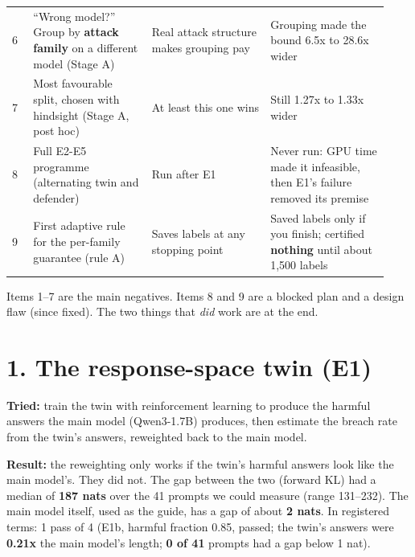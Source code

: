 \documentclass[11pt]{article}
\begin{document}
\begin{longtable}{@{}>{\raggedright\arraybackslash}p{0.059\linewidth}>{\raggedright\arraybackslash}p{0.290\linewidth}>{\raggedright\arraybackslash}p{0.290\linewidth}>{\raggedright\arraybackslash}p{0.290\linewidth}@{}}
\hspace{0pt}6 & \hspace{0pt}``Wrong model?'' Group by \textbf{attack family} on a different model (Stage A) & \hspace{0pt}Real attack structure makes grouping pay & \hspace{0pt}Grouping made the bound 6.5x to 28.6x wider \\
\hspace{0pt}7 & \hspace{0pt}Most favourable split, chosen with hindsight (Stage A, post hoc) & \hspace{0pt}At least this one wins & \hspace{0pt}Still 1.27x to 1.33x wider \\
\hspace{0pt}8 & \hspace{0pt}Full E2-E5 programme (alternating twin and defender) & \hspace{0pt}Run after E1 & \hspace{0pt}Never run: GPU time made it infeasible, then E1's failure removed its premise \\
\hspace{0pt}9 & \hspace{0pt}First adaptive rule for the per-family guarantee (rule A) & \hspace{0pt}Saves labels at any stopping point & \hspace{0pt}Saved labels only if you finish; certified \textbf{nothing} until about 1,500 labels \\
\end{longtable}
\endgroup

Items 1--7 are the main negatives. Items 8 and 9 are a blocked plan and a design flaw (since fixed). The two things that \emph{did} work are at the end.


\section*{1. The response-space twin (E1)}

\textbf{Tried:} train the twin with reinforcement learning to produce the harmful answers the main model (Qwen3-1.7B) produces, then estimate the breach rate from the twin's answers, reweighted back to the main model.


\textbf{Result:} the reweighting only works if the twin's harmful answers look like the main model's. They did not. The gap between the two (forward KL) had a median of \textbf{187 nats} over the 41 prompts we could measure (range 131--232). The main model itself, used as the guide, has a gap of about \textbf{2 nats}. In registered terms: 1 pass of 4 (E1b, harmful fraction 0.85, passed; the twin's answers were \textbf{0.21x} the main model's length; \textbf{0 of 41} prompts had a gap below 1 nat).
\end{document}
